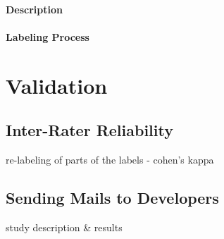 \documentclass[\myrootdir/main.tex]{subfiles}
\begin{document}
    \paragraph{Description}

    \paragraph{Labeling Process}

\section{Validation}

\subsection{Inter-Rater Reliability}
re-labeling of parts of the labels - cohen's kappa

\subsection{Sending Mails to Developers}
study description \& results
\end{document}
